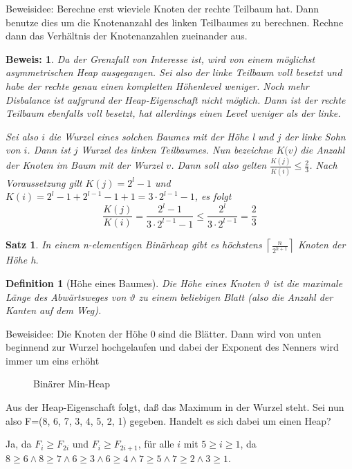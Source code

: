 \documentclass[ngerman,draft,parskip=half*,twoside]{scrreprt}
\theoremstyle{break}
\newtheorem{satz}{Satz}[chapter]
\newtheorem{definition}{Definition}[chapter]
\theoremstyle{nonumberbreak}
\newtheorem{beweis}{Beweis:}
\begin{document}
Beweisidee: Berechne erst wieviele Knoten der rechte Teilbaum hat. Dann benutze dies um die Knotenanzahl des linken Teilbaumes zu
berechnen. Rechne dann das Verhältnis der Knotenanzahlen zueinander aus.
\begin{beweis}
Da der Grenzfall von Interesse ist, wird von einem möglichst asymmetrischen Heap ausgegangen. Sei also der linke Teilbaum voll besetzt
und habe der rechte genau einen kompletten Höhenlevel weniger. Noch mehr Disbalance ist aufgrund der Heap-Eigenschaft nicht möglich.
Dann ist der rechte Teilbaum ebenfalls voll besetzt, hat allerdings einen Level weniger als der linke.

Sei also $i$ die Wurzel eines solchen Baumes mit der Höhe l und $j$ der linke Sohn von $i$. Dann ist $j$ Wurzel des linken Teilbaumes. 
Nun bezeichne $K(v$) die Anzahl der Knoten im Baum mit der Wurzel $v$. Dann soll also gelten 
$\frac{K(j)}{K(i)} \leq \frac{2}{3}$.
Nach Voraussetzung gilt $K(j)=2^l-1$ und $K(i)=2^l-1+2^{l-1}-1+1=3 \cdot 2^{l-1}-1$, es folgt
\[\frac{K(j)}{K(i)}= \frac{2^l-1}{3\cdot 2^{l-1}-1} \leq \frac{2^l}{3 \cdot 2^{l-1}}= \frac{2}{3}\]
\end{beweis}

\begin{satz}
In einem n-elementigen Binärheap gibt es höchstens $\left\lceil \frac{n}{2^{h+1}}\right\rceil$ Knoten der Höhe h.
\end{satz}

\begin{definition}[Höhe eines Baumes]
Die Höhe eines Knoten $\vartheta$ ist die maximale Länge des Abwärtsweges von $\vartheta$ zu einem beliebigen Blatt (also die Anzahl
der Kanten auf dem Weg).
\end{definition}

Beweisidee:
Die Knoten der Höhe 0 sind die Blätter. Dann wird von unten beginnend zur Wurzel hochgelaufen und dabei der
Exponent des Nenners wird immer um eins erhöht
\begin{figure}[H]
	\centering
	\caption{Binärer Min-Heap}
	\label{101103b}
\end{figure}

Aus der Heap-Eigenschaft folgt, daß das Maximum in der Wurzel steht. Sei nun also F=(8, 6, 7, 3, 4, 5, 2, 1) gegeben. Handelt es sich
dabei um einen Heap?

Ja, da $F_{i}\geq F_{2i}$ und $F_{i}\geq F_{2i+1}$, für alle $i$ mit $5\geq i \geq 1$, da $8\geq 6 \wedge 8\geq 7 \wedge6\geq 3 \wedge 
6\geq 4 \wedge 7\geq 5 \wedge 7\geq 2 \wedge 3\geq 1$.
\end{document}
